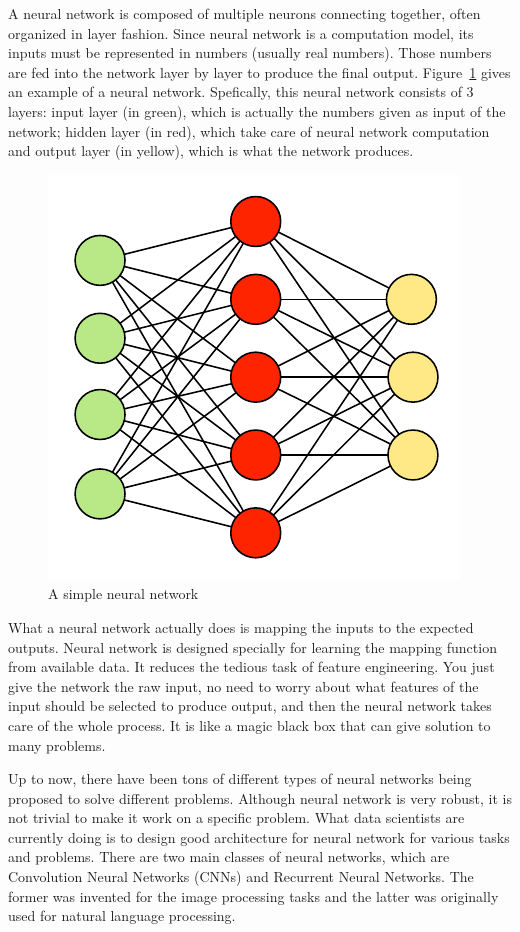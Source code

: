 \documentclass[12pt, sort&compress]{report}
\begin{document}
\par A neural network is composed of multiple neurons connecting together, often organized in layer fashion. Since neural network is a computation model, its inputs must be represented in numbers (usually real numbers). Those numbers are fed into the network layer by layer to produce the final output. Figure~\ref{fig:2:03} gives an example of a neural network. Spefically, this neural network consists of 3 layers: input layer (in green), which is actually the numbers given as input of the network; hidden layer (in red), which take care of neural network computation and output layer (in yellow), which is what the network produces.
\begin{figure}[!htbp]
	\centering
	\includegraphics[scale=1.]{images/PDF/neural-net/neural-net.pdf}
	\caption{A simple neural network}
	\label{fig:2:03}
\end{figure}
\par What a neural network actually does is mapping the inputs to the expected outputs. Neural network is designed specially for learning the mapping function from available data. It reduces the tedious task of feature engineering. You just give the network the raw input, no need to worry about what features of the input should be selected to produce output, and then the neural network takes care of the whole process. It is like a magic black box that can give solution to many problems.
\par Up to now, there have been tons of different types of neural networks being proposed to solve different problems. Although neural network is very robust, it is not trivial to make it work on a specific problem. What data scientists are currently doing is to design good architecture for neural network for various tasks and problems. There are two main classes of neural networks, which are Convolution Neural Networks (CNNs) and Recurrent Neural Networks. The former was invented for the image processing tasks and the latter was originally used for natural language processing.
\end{document}
